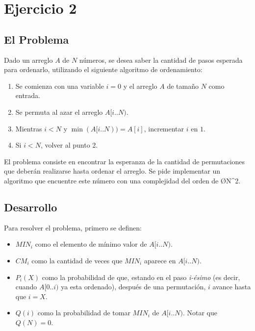 \section{Ejercicio 2}
\subsection{El Problema}

Dado un arreglo $A$ de $N$ números, se desea saber la cantidad de pasos esperada para ordenarlo, utilizando el siguiente algoritmo de ordenamiento:
\begin{enumerate}
	\item Se comienza con una variable $i = 0$ y el arreglo $A$ de tamaño $N$ como entrada.
	\item Se permuta al azar el arreglo $A[i..N)$.
	\item Mientras $i < N$ y $\min(A[i..N)) = A[i]$, incrementar $i$ en $1$.
	\item Si $i < N$, volver al punto 2.
\end{enumerate}

El problema consiste en encontrar la esperanza de la cantidad de permutaciones que deberán realizarse hasta ordenar el arreglo. Se pide implementar un algoritmo que encuentre este número con una complejidad del orden de \O{N^2}.

\subsection{Desarrollo}
Para resolver el problema, primero se definen:
\begin{itemize}
	\item $MIN_{i}$ como el elemento de mínimo valor de $A[i..N)$.
	\item $CM_i$ como la cantidad de veces que $MIN_i$ aparece en $A[i..N)$.
	\item $P_i(X)$ como la probabilidad de que, estando en el paso \emph{i-ésimo} (es decir, cuando $A[0..i)$ ya esta ordenado), después de una permutación, $i$ avance hasta que $i = X$.
	\item $Q(i)$ como la probabilidad de tomar $MIN_i$ de $A[i..N)$. Notar que $Q(N) = 0$.
\end{itemize}

